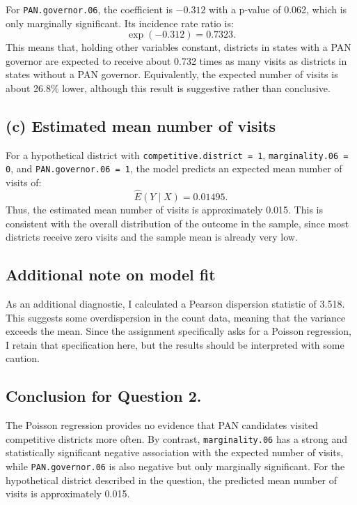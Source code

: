 \documentclass[12pt,letterpaper]{article}
\begin{document}
For \texttt{PAN.governor.06}, the coefficient is $-0.312$ with a p-value of 0.062, which is only marginally significant. Its incidence rate ratio is:
\[
\exp(-0.312) = 0.7323.
\]
This means that, holding other variables constant, districts in states with a PAN governor are expected to receive about 0.732 times as many visits as districts in states without a PAN governor. Equivalently, the expected number of visits is about 26.8\% lower, although this result is suggestive rather than conclusive.

\subsection*{(c) Estimated mean number of visits}
For a hypothetical district with \texttt{competitive.district = 1}, \texttt{marginality.06 = 0}, and \texttt{PAN.governor.06 = 1}, the model predicts an expected mean number of visits of:
\[
\hat{E}(Y \mid X) = 0.01495.
\]
Thus, the estimated mean number of visits is approximately 0.015. This is consistent with the overall distribution of the outcome in the sample, since most districts receive zero visits and the sample mean is already very low.

\subsection*{Additional note on model fit}
As an additional diagnostic, I calculated a Pearson dispersion statistic of 3.518. This suggests some overdispersion in the count data, meaning that the variance exceeds the mean. Since the assignment specifically asks for a Poisson regression, I retain that specification here, but the results should be interpreted with some caution.

\subsection*{Conclusion for Question 2.} 
The Poisson regression provides no evidence that PAN candidates visited competitive districts more often. By contrast, \texttt{marginality.06} has a strong and statistically significant negative association with the expected number of visits, while \texttt{PAN.governor.06} is also negative but only marginally significant. For the hypothetical district described in the question, the predicted mean number of visits is approximately 0.015.
\end{document}
